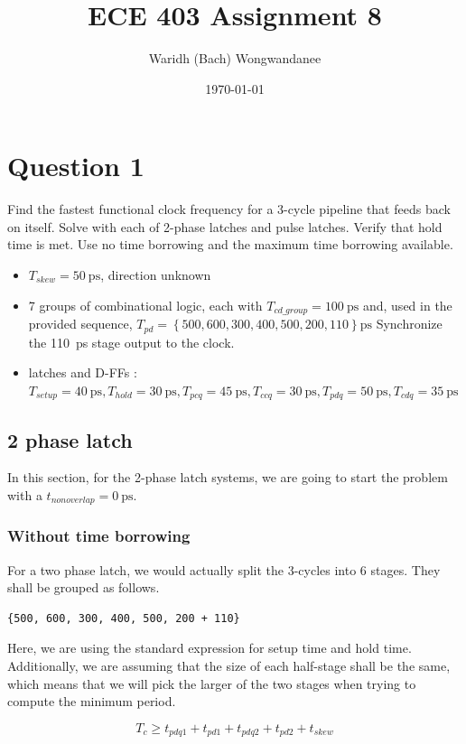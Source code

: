 \documentclass[hidelinks, 12pt]{article}
\author{Waridh (Bach) Wongwandanee}
\date{\today}
\title{ECE 403 Assignment 8}
\begin{document}
\section*{Question 1}
\label{sec:orgd8b70e1}
Find the fastest functional clock frequency for a 3-cycle pipeline that feeds back on itself.
Solve with each of 2-phase latches and pulse latches.
Verify that hold time is met. Use no time borrowing and the maximum time borrowing available.
\begin{itemize}
\item \(T_{skew} = \qty{50}{\pico\s}\), direction unknown
\item 7 groups of combinational logic, each with \(T_{cd\_group} = \qty{100}{\pico\s}\) and, used in the provided sequence, \(T_{pd} = \left\{ 500, 600, 300, 400, 500, 200, 110 \right\} \unit{\pico\s}\) Synchronize the \qty{110}{\pico\s} stage output to the clock.
\item latches and D-FFs : \(T_{setup} = \qty{40}{\pico\s}, T_{hold} = \qty{30}{\pico\s}, T_{pcq}=\qty{45}{\pico\s}, T_{ccq}=\qty{30}{\pico\s}, T_{pdq}=\qty{50}{\pico\s}, T_{cdq}=\qty{35}{\pico\s}\)
\end{itemize}
\subsection*{2 phase latch}
\label{sec:org7e0fad8}
In this section, for the 2-phase latch systems, we are going to start the problem with a \(t_{nonoverlap}=\qty{0}{\pico\s}\).
\subsubsection*{Without time borrowing}
\label{sec:org4fc234a}
For a two phase latch, we would actually split the 3-cycles into 6 stages.
They shall be grouped as follows.

\begin{verbatim}
{500, 600, 300, 400, 500, 200 + 110}
\end{verbatim}

Here, we are using the standard expression for setup time and hold time.
Additionally, we are assuming that the size of each half-stage shall be the same, which means that we will pick the larger of the two stages when trying to compute the minimum period.

\begin{equation}
\label{eq-2-phase-prop}
T_c \geq  t_{pdq1} + t_{pd1} + t_{pdq2} + t_{pd2} + t_{skew}
\end{equation}
\end{document}
